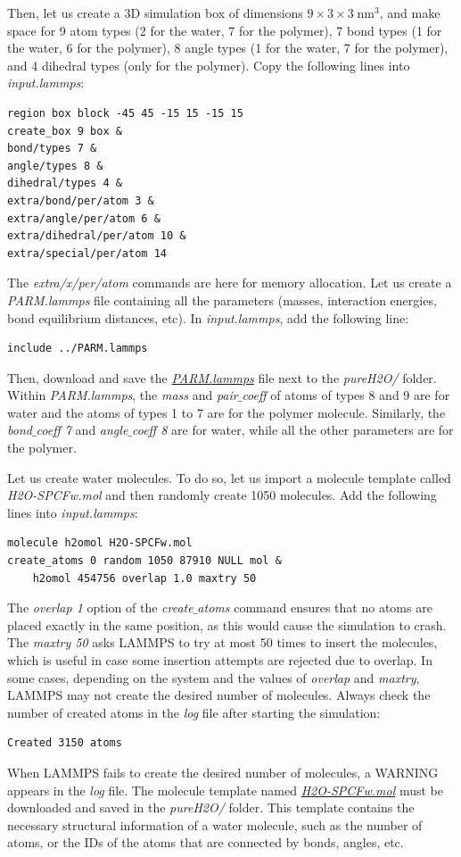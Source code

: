 \documentclass[9pt,tutorial]{livecoms}
\begin{document}
Then, let us create a 3D simulation box of dimensions $9 \times 3 \times 3 \; \text{nm}^3$, and make space for 9 atom types (2 for the water, 7 for the polymer), 7 bond types (1 for the water, 6 for the polymer), 8 angle types (1 for the water, 7 for the polymer), and 4 dihedral types (only for the polymer). Copy the following lines into \textit{input.lammps}:
{\normalsize \begin{verbatim}
region box block -45 45 -15 15 -15 15
create_box 9 box &
bond/types 7 &
angle/types 8 &
dihedral/types 4 &
extra/bond/per/atom 3 &
extra/angle/per/atom 6 &
extra/dihedral/per/atom 10 &
extra/special/per/atom 14
\end{verbatim}}
The \textit{extra/x/per/atom} commands are here for
memory allocation. 
Let us create a \textit{PARM.lammps} file containing all the parameters (masses, interaction energies, bond equilibrium
distances, etc). In \textit{input.lammps}, add the following line:
{\normalsize \begin{verbatim}
include ../PARM.lammps
\end{verbatim}}
Then, download and save the \href{https://raw.githubusercontent.com/lammpstutorials/lammpstutorials-article/main/files/tutorial3/PARM.lammps}{\textit{PARM.lammps}} file next to the \textit{pureH2O/} folder. Within \textit{PARM.lammps}, the \textit{mass} and \textit{pair$\_$coeff} of atoms of types 8 and 9 are for water and the atoms of types 1 to 7 are for the polymer molecule. Similarly, the \textit{bond$\_$coeff 7} and \textit{angle$\_$coeff 8} are for water, while all the other parameters are for the polymer.

Let us create water molecules. To do so, let us import a molecule template called
\textit{H2O-SPCFw.mol} and then randomly create 1050 molecules. Add the following lines into \textit{input.lammps}:
{\normalsize \begin{verbatim}
molecule h2omol H2O-SPCFw.mol
create_atoms 0 random 1050 87910 NULL mol &
    h2omol 454756 overlap 1.0 maxtry 50
\end{verbatim}}
The \textit{overlap 1} option of the \textit{create$\_$atoms} command ensures that no atoms are placed exactly in the same position, as this would cause the simulation to crash. The \textit{maxtry 50} asks LAMMPS to try at most 50 times to insert the molecules, which is useful in case some insertion attempts are rejected due to overlap. In some cases, depending on the system and the values of \textit{overlap} and \textit{maxtry}, LAMMPS may not create the desired number of molecules. Always check the number of created atoms in the \textit{log} file after starting the simulation:
{\normalsize \begin{verbatim}
Created 3150 atoms
\end{verbatim}}
When LAMMPS fails to create the desired number of molecules, a WARNING appears in the \textit{log} file.
The molecule template named \href{https://raw.githubusercontent.com/lammpstutorials/lammpstutorials-article/main/files/tutorial3/H2O-SPCFw.mol}{\textit{H2O-SPCFw.mol}} must be downloaded and saved in the \textit{pureH2O/} folder. This template contains the necessary structural information of a water molecule, such as the number of atoms, or the IDs of the atoms that are connected by bonds, angles, etc.
\end{document}
